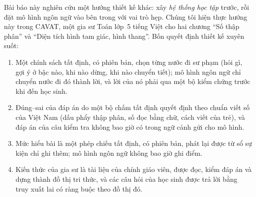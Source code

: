 Bài báo này nghiên cứu một hướng thiết kế khác: xây \emph{hệ thống học tập} trước, rồi đặt mô hình ngôn ngữ vào bên trong với vai trò hẹp. Chúng tôi hiện thực hướng này trong CAVAT, một gia sư Toán lớp~5 tiếng Việt cho hai chương ``Số thập phân'' và ``Diện tích hình tam giác, hình thang''. Bốn quyết định thiết kế xuyên suốt:
\begin{enumerate}
  \item Một chính sách tất định, có phiên bản, chọn từng nước đi sư phạm (hỏi gì, gợi ý ở bậc nào, khi nào dừng, khi nào chuyển tiết); mô hình ngôn ngữ chỉ chuyển nước đi đó thành lời, và lời của nó phải qua một bộ kiểm chứng trước khi đến học sinh.
  \item Đúng--sai của đáp án do một bộ chấm tất định quyết định theo chuẩn viết số của Việt Nam (dấu phẩy thập phân, số đọc bằng chữ, cách viết của trẻ), và đáp án của câu kiểm tra không bao giờ có trong ngữ cảnh gửi cho mô hình.
  \item Mức hiểu bài là một phép chiếu tất định, có phiên bản, phát lại được từ sổ sự kiện chỉ ghi thêm; mô hình ngôn ngữ không bao giờ ghi điểm.
  \item Kiến thức của gia sư là tài liệu của chính giáo viên, được đọc, kiểm đáp án và dựng thành đồ thị tri thức, và các câu hỏi của học sinh được trả lời bằng truy xuất lai có ràng buộc theo đồ thị đó.
\end{enumerate}

